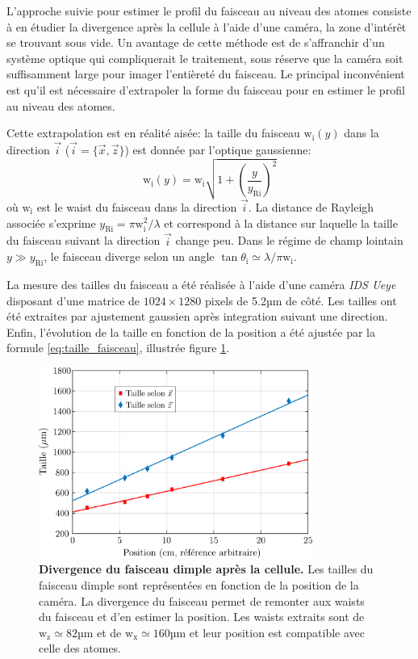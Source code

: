 L'approche suivie pour estimer le profil du faisceau au niveau des atomes consiste à en étudier la divergence après la cellule à l'aide d'une caméra, la zone d'intérêt se trouvant sous vide. Un avantage de cette méthode est de s'affranchir d'un système optique qui compliquerait le traitement, sous réserve que la caméra soit suffisamment large pour imager l'entièreté du faisceau. Le principal inconvénient est qu'il est nécessaire d'extrapoler la forme du faisceau pour en estimer le profil au niveau des atomes.

Cette extrapolation est en réalité aisée: la taille du faisceau $\mathrm{w}_{\mathrm{i}}(y)$ dans la direction $\vec{i}$ ($\vec{i}= \lbrace \vec{x},\vec{z} \rbrace$) est donnée par l'optique gaussienne:
\begin{equation}
\mathrm{w}_{\mathrm{i}}(y)=\mathrm{w}_{\mathrm{i}} \sqrt{1+\left( \frac{y}{y_{\mathrm{Ri}}} \right)^2}
\label{eq:taille_faisceau}
\end{equation}
où $\mathrm{w}_{\mathrm{i}}$ est le waist du faisceau dans la direction $\vec{i}$. La distance de Rayleigh associée s'exprime $y_{\mathrm{Ri}}=\pi \mathrm{w}_{\mathrm{i}}^2 / \lambda$ et correspond à la distance sur laquelle la taille du faisceau suivant la direction $\vec{i}$ change peu. Dans le régime de champ lointain $y \gg y_{\mathrm{Ri}}$, le faisceau diverge selon un angle $\tan \theta_{\mathrm{i}} \simeq \lambda / \pi \mathrm{w}_{\mathrm{i}}$.

La mesure des tailles du faisceau a été réalisée à l'aide d'une caméra \emph{IDS Ueye} disposant d'une matrice de $1024 \times 1280$ pixels de 5.2µm de côté. Les tailles ont été extraites par ajustement gaussien après integration suivant une direction. Enfin, l'évolution de la taille en fonction de la position a été ajustée par la formule \ref{eq:taille_faisceau}, illustrée figure \ref{fig:taille_dimple}.

\begin{figure}
\centering
\includegraphics[width=0.8\textwidth]{../Fig/Modif_exp/expansion_dimple.pdf}
\caption{\textbf{Divergence du faisceau dimple après la cellule.} Les tailles du faisceau dimple sont représentées en fonction de la position de la caméra. La divergence du faisceau permet de remonter aux waists du faisceau et d'en estimer la position. Les waists extraits sont de $\mathrm{w_z}\simeq82$µm et de $\mathrm{w_x}\simeq160$µm et leur position est compatible avec celle des atomes.}
\label{fig:taille_dimple}
\end{figure}

